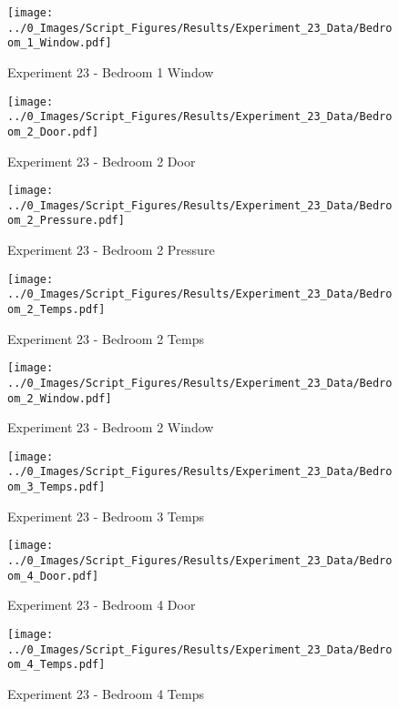 	\clearpage

	\begin{figure}[H]
		\centering
		\texttt{[image: ../0\_Images/Script\_Figures/Results/Experiment\_23\_Data/Bedroom\_1\_Window.pdf]}
		\caption[]{Experiment 23 - Bedroom 1 Window}
	\end{figure}
 

	\begin{figure}[H]
		\centering
		\texttt{[image: ../0\_Images/Script\_Figures/Results/Experiment\_23\_Data/Bedroom\_2\_Door.pdf]}
		\caption[]{Experiment 23 - Bedroom 2 Door}
	\end{figure}
 
	\clearpage

	\begin{figure}[H]
		\centering
		\texttt{[image: ../0\_Images/Script\_Figures/Results/Experiment\_23\_Data/Bedroom\_2\_Pressure.pdf]}
		\caption[]{Experiment 23 - Bedroom 2 Pressure}
	\end{figure}
 

	\begin{figure}[H]
		\centering
		\texttt{[image: ../0\_Images/Script\_Figures/Results/Experiment\_23\_Data/Bedroom\_2\_Temps.pdf]}
		\caption[]{Experiment 23 - Bedroom 2 Temps}
	\end{figure}
 
	\clearpage

	\begin{figure}[H]
		\centering
		\texttt{[image: ../0\_Images/Script\_Figures/Results/Experiment\_23\_Data/Bedroom\_2\_Window.pdf]}
		\caption[]{Experiment 23 - Bedroom 2 Window}
	\end{figure}
 

	\begin{figure}[H]
		\centering
		\texttt{[image: ../0\_Images/Script\_Figures/Results/Experiment\_23\_Data/Bedroom\_3\_Temps.pdf]}
		\caption[]{Experiment 23 - Bedroom 3 Temps}
	\end{figure}
 
	\clearpage

	\begin{figure}[H]
		\centering
		\texttt{[image: ../0\_Images/Script\_Figures/Results/Experiment\_23\_Data/Bedroom\_4\_Door.pdf]}
		\caption[]{Experiment 23 - Bedroom 4 Door}
	\end{figure}
 

	\begin{figure}[H]
		\centering
		\texttt{[image: ../0\_Images/Script\_Figures/Results/Experiment\_23\_Data/Bedroom\_4\_Temps.pdf]}
		\caption[]{Experiment 23 - Bedroom 4 Temps}
	\end{figure}
 
